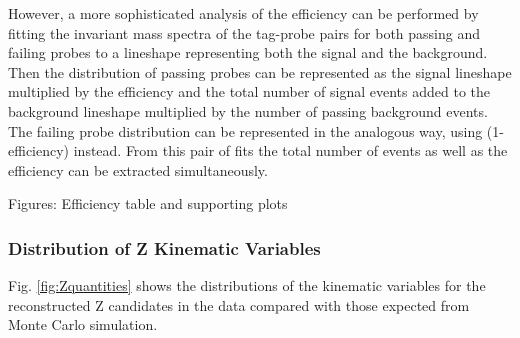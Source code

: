 However, a more sophisticated analysis of the efficiency can be performed by fitting the invariant mass spectra of the
tag-probe pairs for both passing and failing probes to a lineshape representing both the signal and the background.  
Then the distribution of passing probes can be represented as the signal lineshape multiplied by the efficiency and the
total number of signal events added to the background lineshape multiplied by the number of passing background events.  
The failing probe distribution can be represented in the analogous way, using (1-efficiency) instead.  
From this pair of fits the total number of events as well as the efficiency can be extracted simultaneously.  

Figures: Efficiency table and supporting plots

\subsubsection{Distribution of Z Kinematic Variables}
\label{evSel:Zquants}
Fig. \ref{fig:Zquantities} shows the distributions of the kinematic variables for the reconstructed Z candidates 
in the data compared with those expected from Monte Carlo simulation.  

